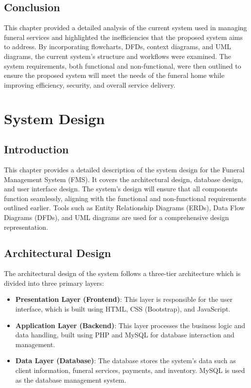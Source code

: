\documentclass[a4paper,12pt]{report}
\begin{document}
\section{Conclusion}
This chapter provided a detailed analysis of the current system used in managing funeral services and highlighted the inefficiencies that the proposed system aims to address. By incorporating flowcharts, DFDs, context diagrams, and UML diagrams, the current system's structure and workflows were examined. The system requirements, both functional and non-functional, were then outlined to ensure the proposed system will meet the needs of the funeral home while improving efficiency, security, and overall service delivery.

\newpage
\chapter{System Design}

\section{Introduction}
This chapter provides a detailed description of the system design for the Funeral Management System (FMS). It covers the architectural design, database design, and user interface design. The system's design will ensure that all components function seamlessly, aligning with the functional and non-functional requirements outlined earlier. Tools such as Entity Relationship Diagrams (ERDs), Data Flow Diagrams (DFDs), and UML diagrams are used for a comprehensive design representation.

\section{Architectural Design}
The architectural design of the system follows a three-tier architecture which is divided into three primary layers:

\begin{itemize}
    \item \textbf{Presentation Layer (Frontend)}: This layer is responsible for the user interface, which is built using HTML, CSS (Bootstrap), and JavaScript.
    \item \textbf{Application Layer (Backend)}: This layer processes the business logic and data handling, built using PHP and MySQL for database interaction and management.
    \item \textbf{Data Layer (Database)}: The database stores the system’s data such as client information, funeral services, payments, and inventory. MySQL is used as the database management system.
\end{itemize}
\end{document}
